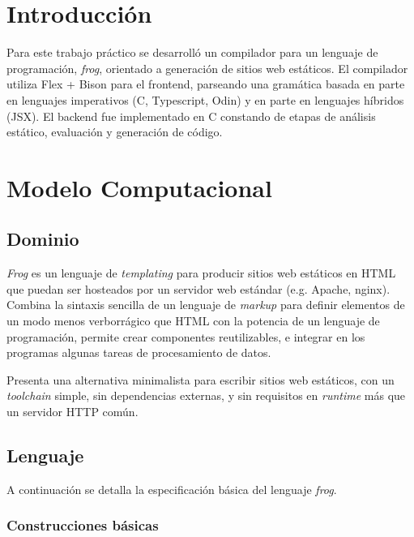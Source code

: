 





\tableofcontents
\pagebreak

\section{Introducción}

Para este trabajo práctico se desarrolló un compilador para un lenguaje de programación, \textit{frog}, orientado a generación de sitios web estáticos. El compilador utiliza Flex + Bison para el frontend, parseando una gramática basada en parte en lenguajes imperativos (C, Typescript, Odin) y en parte en lenguajes híbridos (JSX). El backend fue implementado en C constando de etapas de análisis estático, evaluación y generación de código.

\section{Modelo Computacional}

\subsection{Dominio}

\textit{Frog} es un lenguaje de \textit{templating} para producir sitios web estáticos en HTML que puedan ser hosteados por un servidor web estándar (e.g. Apache, nginx). Combina la sintaxis sencilla de un lenguaje de \textit{markup} para definir elementos de un modo menos verborrágico que HTML con la potencia de un lenguaje de programación, permite crear componentes reutilizables, e integrar en los programas algunas tareas de procesamiento de datos.

Presenta una alternativa minimalista para escribir sitios web estáticos, con un \textit{toolchain} simple, sin dependencias externas, y sin requisitos en \textit{runtime} más que un servidor HTTP común.

\subsection{Lenguaje}

A continuación se detalla la especificación básica del lenguaje \textit{frog}.

\subsubsection{Construcciones básicas}

